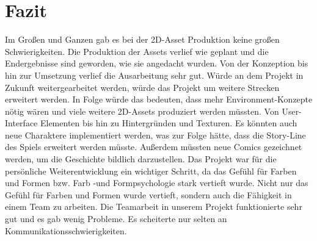 \section{Fazit}
Im Großen und Ganzen gab es bei der 2D-Asset Produktion keine großen Schwierigkeiten. Die Produktion der Assets verlief wie geplant und die Endergebnisse sind geworden, wie sie angedacht wurden. Von der Konzeption bis hin zur Umsetzung verlief die Ausarbeitung sehr gut. 
Würde an dem Projekt in Zukunft weitergearbeitet werden, würde das Projekt um weitere Strecken erweitert werden. In Folge würde das bedeuten, dass mehr Environment-Konzepte nötig wären und viele weitere 2D-Assets produziert werden müssten. Von User-Interface Elementen bis hin zu Hintergründen und Texturen. Es könnten auch neue Charaktere implementiert werden, was zur Folge hätte, dass die Story-Line des Spiels erweitert werden müsste. Außerdem müssten neue Comics gezeichnet werden, um die Geschichte bildlich darzustellen. 
Das Projekt war für die persönliche Weiterentwicklung ein wichtiger Schritt, da das Gefühl für Farben und Formen bzw. Farb -und Formpsychologie stark vertieft wurde. Nicht nur das Gefühl für Farben und Formen wurde vertieft, sondern auch die Fähigkeit in einem Team zu arbeiten. Die Teamarbeit in unserem Projekt funktionierte sehr gut und es gab wenig Probleme. Es scheiterte nur selten an Kommunikationsschwierigkeiten. 




